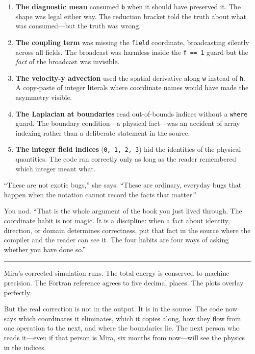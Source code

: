 \documentclass[11pt,]{article}
\begin{document}
\begin{enumerate}
\def\labelenumi{\arabic{enumi}.}
\item
  \textbf{The diagnostic mean} consumed \texttt{b} when it should have
  preserved it. The shape was legal either way. The reduction bracket
  told the truth about what was consumed---but the truth was wrong.
\item
  \textbf{The coupling term} was missing the \texttt{field} coordinate,
  broadcasting silently across all fields. The broadcast was harmless
  inside the \texttt{f\ ==\ 1} guard but the \emph{fact} of the
  broadcast was invisible.
\item
  \textbf{The velocity-y advection} used the spatial derivative along
  \texttt{w} instead of \texttt{h}. A copy-paste of integer literals
  where coordinate names would have made the asymmetry visible.
\item
  \textbf{The Laplacian at boundaries} read out-of-bounds indices
  without a \texttt{where} guard. The boundary condition---a physical
  fact---was an accident of array indexing rather than a deliberate
  statement in the source.
\item
  \textbf{The integer field indices} (\texttt{0,\ 1,\ 2,\ 3}) hid the
  identities of the physical quantities. The code ran correctly only as
  long as the reader remembered which integer meant what.
\end{enumerate}

``These are not exotic bugs,'' she says. ``These are ordinary, everyday
bugs that happen when the notation cannot record the facts that
matter.''

You nod. ``That is the whole argument of the book you just lived
through. The coordinate habit is not magic. It is a discipline: when a
fact about identity, direction, or domain determines correctness, put
that fact in the source where the compiler and the reader can see it.
The four habits are four ways of asking whether you have done so.''

\begin{center}\rule{0.5\linewidth}{0.4pt}\end{center}

Mira's corrected simulation runs. The total energy is conserved to
machine precision. The Fortran reference agrees to five decimal places.
The plots overlay perfectly.

But the real correction is not in the output. It is in the source. The
code now says which coordinates it eliminates, which it copies along,
how they flow from one operation to the next, and where the boundaries
lie. The next person who reads it---even if that person is Mira, six
months from now---will see the physics in the indices.
\end{document}

